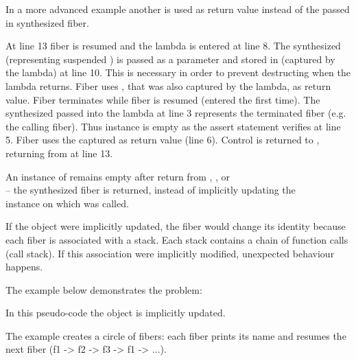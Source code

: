In a more advanced example another \fiber is used as return value instead of the
passed in synthesized fiber.

At line 13 fiber  is resumed and the lambda is entered at line 8. The
synthesized \fiber\xspace {} (representing suspended \main) is passed as a
parameter  and stored in  (captured by the lambda) at line 10.
This is necessary in order to prevent destructing  when the lambda
returns. Fiber  uses , that was also captured by the lambda, as
return value. Fiber  terminates while fiber  is resumed (entered
the first time). The synthesized \fiber\xspace {} passed into the lambda at line 3
represents the terminated fiber  (e.g. the calling fiber). Thus instance
 is empty as the assert statement verifies at line 5. Fiber  uses
the captured \fiber\xspace {} as return value (line 6). Control is returned to
\main, returning from  at line 13.


\label{fiberreturn}
An instance of \fiber remains empty after return from \resume, \resumewith,
\xtresume or\\
\xtresumewith -- the synthesized fiber is returned, instead of
implicitly updating the\\\fiber instance on which \resume was called.

If the \fiber object were implicitly updated, the fiber would 
change its identity because each fiber is associated with a stack. Each stack
contains a chain of function calls (call stack). If this association were
implicitly modified, unexpected behaviour happens.

The example below demonstrates the problem:

In this pseudo-code the \fiber object is implicitly updated.

The example creates a circle of fibers: each fiber prints its name and resumes
the next fiber (f1 -> f2 -> f3 -> f1 -> ...).


